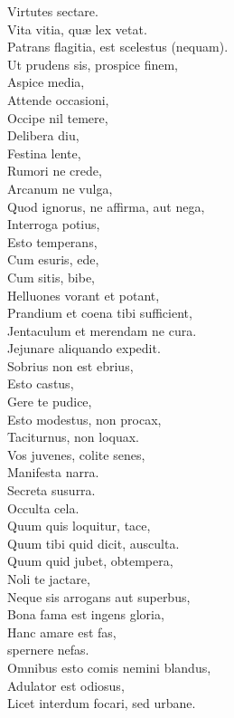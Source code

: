 \documentclass[12pt, twocolumn]{memoir}
\begin{document}
Virtutes sectare.\\
Vita vitia, quæ lex vetat.\\
Patrans flagitia, est scelestus (nequam).\\
Ut prudens sis, prospice finem,\\
Aspice media,\\
Attende occasioni,\\
Occipe nil temere,\\
Delibera diu,\\
Festina lente,\\
Rumori ne crede,\\
Arcanum ne vulga,\\
Quod ignorus, ne affirma, aut nega,\\
Interroga potius,\\
Esto temperans,\\
Cum esuris, ede,\\
Cum sitis, bibe,\\
Helluones vorant et potant,\\
Prandium et coena tibi sufficient,\\
Jentaculum et merendam ne cura.\\
Jejunare aliquando expedit.\\
Sobrius non est ebrius,\\
Esto castus,\\
Gere te pudice,\\
Esto modestus, non procax,\\
Taciturnus, non loquax.\\
Vos juvenes, colite senes,\\
Manifesta narra.\\
Secreta susurra.\\
Occulta cela.\\
Quum quis loquitur, tace,\\
Quum tibi quid dicit, ausculta.\\
Quum quid jubet, obtempera,\\
Noli te jactare,\\
Neque sis arrogans aut superbus,\\
Bona fama est ingens gloria,\\
Hanc amare est fas,\\
spernere nefas.\\
Omnibus esto comis nemini blandus,\\
Adulator est odiosus,\\
Licet interdum focari, sed urbane.\\
\end{document}
